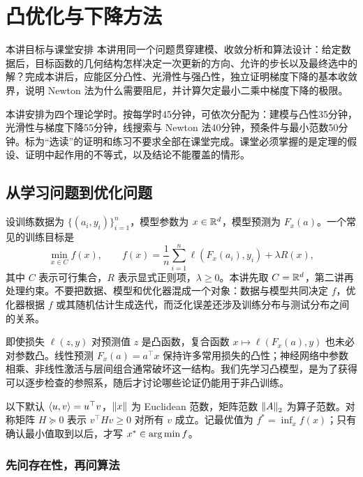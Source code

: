 \chapter{凸优化与下降方法}
\label{l1:chapter}

\begin{coursebox}{本讲目标与课堂安排}
本讲用同一个问题贯穿建模、收敛分析和算法设计：给定数据后，目标函数的几何结构怎样决定一次更新的方向、允许的步长以及最终选中的解？完成本讲后，应能区分凸性、光滑性与强凸性，独立证明梯度下降的基本收敛界，说明 Newton 法为什么需要阻尼，并计算欠定最小二乘中梯度下降的极限。

本讲安排为四个理论学时。按每学时45分钟，可依次分配为：建模与凸性35分钟，光滑性与梯度下降55分钟，线搜索与 Newton 法40分钟，预条件与最小范数50分钟。标为“选读”的证明和练习不要求全部在课堂完成。课堂必须掌握的是定理的假设、证明中起作用的不等式，以及结论不能覆盖的情形。
\end{coursebox}

\section{从学习问题到优化问题}
\label{l1:modeling}

设训练数据为 $\{(a_i,y_i)\}_{i=1}^n$，模型参数为 $x\in\mathbb R^d$，模型预测为 $F_x(a)$。一个常见的训练目标是
\begin{equation}
    \min_{x\in C} f(x),\qquad
    f(x)=\frac1n\sum_{i=1}^n\ell(F_x(a_i),y_i)+\lambda R(x),
    \label{l1:erm}
\end{equation}
其中 $C$ 表示可行集合，$R$ 表示显式正则项，$\lambda\geq0$。本讲先取 $C=\mathbb R^d$，第二讲再处理约束。不要把数据、模型和优化器混成一个对象：数据与模型共同决定 $f$，优化器根据 $f$ 或其随机估计生成迭代，而泛化误差还涉及训练分布与测试分布之间的关系。

即使损失 $\ell(z,y)$ 对预测值 $z$ 是凸函数，复合函数 $x\mapsto\ell(F_x(a),y)$ 也未必对参数凸。线性预测 $F_x(a)=a^\top x$ 保持许多常用损失的凸性；神经网络中参数相乘、非线性激活与层间组合通常破坏这一结构。我们先学习凸模型，是为了获得可以逐步检查的参照系，随后才讨论哪些论证仍能用于非凸训练。

以下默认 $\left\langle u,v\right\rangle=u^\top v$，$\left\lVert x\right\rVert$ 为 Euclidean 范数，矩阵范数 $\left\lVert A\right\rVert_2$ 为算子范数。对称矩阵 $H\succeq0$ 表示 $v^\top Hv\geq0$ 对所有 $v$ 成立。记最优值为 $f^*=\inf_x f(x)$；只有确认最小值取到以后，才写 $x^*\in\operatorname*{arg\,min} f$。

\subsection{先问存在性，再问算法}

